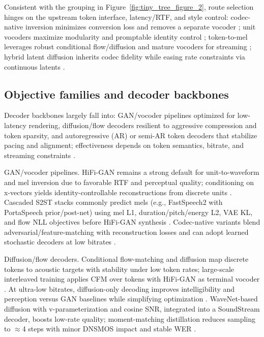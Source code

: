 \documentclass{article}
\begin{document}
Consistent with the grouping in Figure~\ref{fig:tiny_tree_figure_2}, route selection hinges on the upstream token interface, latency/RTF, and style control: codec-native inversion minimizes conversion loss and removes a separate vocoder \cite{peng2024mslms2stmultitaskspeechlanguagemodeltext}; unit vocoders maximize modularity and promptable identity control \cite{ma2024languagemodelcanlistenwhilespeaking}; token-to-mel leverages robust conditional flow/diffusion and mature vocoders for streaming \cite{zeng2024scalingspeechtextpretrainingsyntheticint,wang2025tadicodectextawarediffusionspeechtokeniz}; hybrid latent diffusion inherits codec fidelity while easing rate constraints via continuous latents \cite{yang2025diffsoundstreamefficientspeechtokenizati}.

\subsection{Objective families and decoder backbones} \label{subsec:objectivefamiliesanddecoderbackbones}
Decoder backbones largely fall into: GAN/vocoder pipelines optimized for low-latency rendering, diffusion/flow decoders resilient to aggressive compression and token sparsity, and autoregressive (AR) or semi-AR token decoders that stabilize pacing and alignment; effectiveness depends on token semantics, bitrate, and streaming constraints \cite{li2024investigatingneuralaudiocodecsspeechlang,shen2024acousticbpespeechgenerationdiscretetoken,zhang2024speechtokenizerunifiedspeechtokenizerlar,yang2025diffsoundstreamefficientspeechtokenizati}.

GAN/vocoder pipelines. HiFi-GAN remains a strong default for unit-to-waveform and mel inversion due to favorable RTF and perceptual quality; conditioning on x-vectors yields identity-controllable reconstructions from discrete units \cite{nakata2024jchatjapaneselargescalespokendialoguecor}. Cascaded S2ST stacks commonly predict mels (e.g., FastSpeech2 with PortaSpeech prior/post-net) using mel L1, duration/pitch/energy L2, VAE KL, and flow NLL objectives before HiFi-GAN synthesis \cite{huang2023holisticcascadesystembenchmarkhumanevalu}. Codec-native variants blend adversarial/feature-matching with reconstruction losses and can adopt learned stochastic decoders at low bitrates \cite{yang2025diffsoundstreamefficientspeechtokenizati}.

Diffusion/flow decoders. Conditional flow-matching and diffusion map discrete tokens to acoustic targets with stability under low token rates; large-scale interleaved training applies CFM over tokens with HiFi-GAN as terminal vocoder \cite{zeng2024scalingspeechtextpretrainingsyntheticint}. At ultra-low bitrates, diffusion-only decoding improves intelligibility and perception versus GAN baselines while simplifying optimization \cite{wang2025tadicodectextawarediffusionspeechtokeniz}. WaveNet-based diffusion with v-parameterization and cosine SNR, integrated into a SoundStream decoder, boosts low-rate quality; moment-matching distillation reduces sampling to $\approx$4 steps with minor DNSMOS impact and stable WER \cite{yang2025diffsoundstreamefficientspeechtokenizati}.
\end{document}

